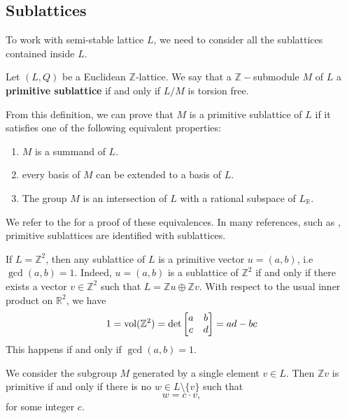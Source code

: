\subsection{Sublattices}
To work with semi-stable lattice $L$, we need to consider all the sublattices contained inside $L$.
\begin{definition}[\label=sublattice]
    Let $(L,Q)$ be a Euclidean $\mathbb{Z}$-lattice. We say that a $\mathbb{Z}-$submodule $M$ of
    $L$ a \textbf{primitive sublattice} if and only if $L/M$ is torsion free.
\end{definition}
From this definition, we can prove that $M$ is a primitive sublattice of $L$ if it satisfies one of the
following equivalent properties:
\begin{enumerate}
    \item $M$ is a summand of $L$.
    \item every basis of $M$ can be extended to a basis of $L$.
    \item The group $M$ is an intersection of $L$ with a rational subspace of $L_\mathbb{R}$.
\end{enumerate}
We refer to the \cite[Section 1.4]{MR4505757} for a proof of these equivalences. In many references, such as \cite{MR2127941}, primitive sublattices are identified with sublattices. 
\begin{example}
    If $L = \mathbb{Z}^2$, then any sublattice of $L$ is a primitive vector $u = (a,b)$, i.e
    $\gcd(a,b)=1$. Indeed, $u=(a,b)$ is a sublattice of $\mathbb{Z}^2$ if and only if there exists a vector $v \in \mathbb{Z}^2$
    such that $L = \mathbb{Z}u \oplus \mathbb{Z}v$. With respect to the usual inner product on $\mathbb{R}^2$,
    we have
    \[1 = \operatorname{vol}(\mathbb{Z}^2) = \det \begin{bmatrix}
            a & b \\
            c & d
        \end{bmatrix} = ad-bc\]
    This happens if and only if $\gcd(a,b)=1$.
\end{example}

\begin{example}
    We consider the subgroup $M$ generated by a single element $v \in L$. Then $\mathbb{Z}v$ is primitive if and only if there is no $w \in L \setminus \{v\}$ such that
    \[w = c\cdot v,\]
    for some integer $c$.
\end{example}
